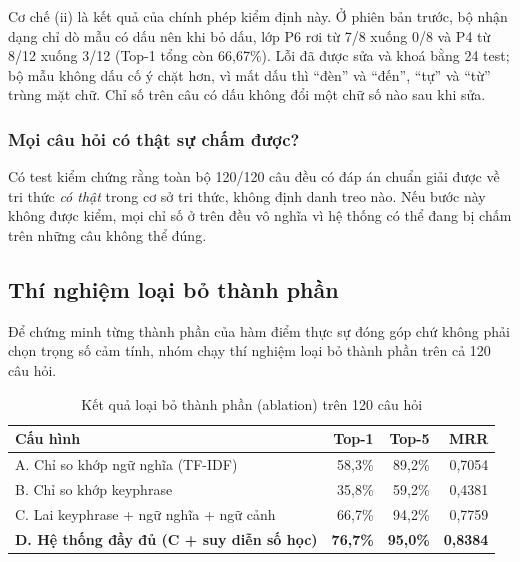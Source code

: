 \begin{warnbox}
Cơ chế (ii) là kết quả của chính phép kiểm định này. Ở phiên bản trước, bộ nhận dạng chỉ dò mẫu
có dấu nên khi bỏ dấu, lớp P6 rơi từ 7/8 xuống 0/8 và P4 từ 8/12 xuống 3/12 (Top-1 tổng còn
66,67\%). Lỗi đã được sửa và khoá bằng 24 test; bộ mẫu không dấu cố ý chặt hơn, vì mất dấu thì
``đèn'' và ``đến'', ``tự'' và ``từ'' trùng mặt chữ. Chỉ số trên câu có dấu không đổi một chữ số
nào sau khi sửa.
\end{warnbox}

\subsubsection{Mọi câu hỏi có thật sự chấm được?}

Có test kiểm chứng rằng toàn bộ 120/120 câu đều có đáp án chuẩn giải được về tri thức
\emph{có thật} trong cơ sở tri thức, không định danh treo nào. Nếu bước này không được kiểm,
mọi chỉ số ở trên đều vô nghĩa vì hệ thống có thể đang bị chấm trên những câu không thể đúng.

\subsection{Thí nghiệm loại bỏ thành phần}
\label{sec:ablation}

Để chứng minh từng thành phần của hàm điểm thực sự đóng góp chứ không phải chọn trọng số cảm
tính, nhóm chạy thí nghiệm loại bỏ thành phần trên cả 120 câu hỏi.

\begin{table}[H]
\centering
\caption{Kết quả loại bỏ thành phần (ablation) trên 120 câu hỏi}
\label{tab:ablation}
\renewcommand{\arraystretch}{1.2}
\begin{tabularx}{\textwidth}{@{}L r r r@{}}
\toprule
\textbf{Cấu hình} & \textbf{Top-1} & \textbf{Top-5} & \textbf{MRR} \\
\midrule
A. Chỉ so khớp ngữ nghĩa (TF-IDF)          & 58,3\% & 89,2\% & 0,7054 \\
B. Chỉ so khớp keyphrase                   & 35,8\% & 59,2\% & 0,4381 \\
C. Lai keyphrase + ngữ nghĩa + ngữ cảnh    & 66,7\% & 94,2\% & 0,7759 \\
\textbf{D. Hệ thống đầy đủ (C + suy diễn số học)} & \textbf{76,7\%} & \textbf{95,0\%} & \textbf{0,8384} \\
\bottomrule
\end{tabularx}
\end{table}

